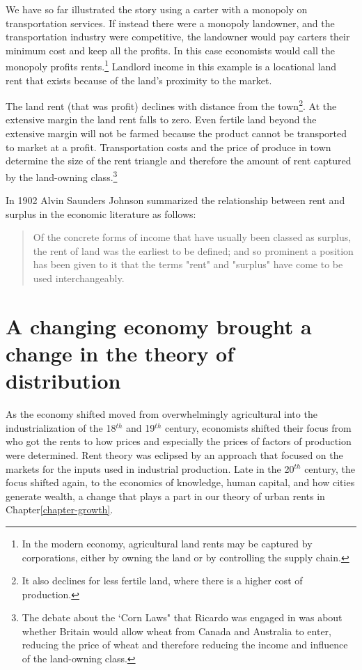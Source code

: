 We have so far illustrated the story using a carter with a monopoly on transportation services. If instead there were a monopoly landowner, and the transportation industry were competitive, the landowner would pay carters their minimum cost and keep all the profits. In this case economists would call the monopoly profits rents.\footnote{In the modern economy, agricultural land rents may be captured by corporations,  either by owning the land or by controlling the supply chain.}  Landlord income in this example is a locational land rent that exists because of the land's proximity to the market.  

The land rent (that was profit) declines with distance from the town\footnote{It also declines for less fertile land, where there is a higher cost of production.}. At the extensive margin the land rent falls to zero. Even fertile land beyond the extensive margin will not be farmed because the product cannot be transported to market at a profit. Transportation costs and the price of produce in town determine the size of the  rent triangle and therefore the amount of rent captured by the land-owning class.\footnote{The debate about the  `Corn Laws" that Ricardo  was engaged in was about whether Britain would allow wheat from Canada and Australia to enter, reducing the price of wheat and therefore reducing the income and influence of the land-owning class.} 


In 1902 Alvin Saunders Johnson \cite{johnsonRentModernEconomic1902} summarized the relationship between rent and surplus in the economic literature as follows: 

\begin{quotation}Of the concrete forms of income that have usually been classed as surplus, the rent of land was the earliest to be defined; and so prominent a position has been given to it that the terms "rent" and "surplus" have come to be used interchangeably.\end{quotation} 

\section{A changing economy brought a change in the theory of distribution}
As the economy shifted  moved from overwhelmingly  agricultural into the industrialization of the 18$^{th}$  and 19$^{th}$ century, economists shifted their focus from who got the rents to how prices and especially the prices of factors of production were determined. Rent theory was eclipsed by an approach that focused on the markets for the inputs used in industrial production.  Late in the 20$^{th}$ century, the focus shifted again, to the economics of  knowledge, human capital, and how cities generate wealth, a change that plays a part in  our theory of urban rents in Chapter\ref{chapter-growth}. 
 
